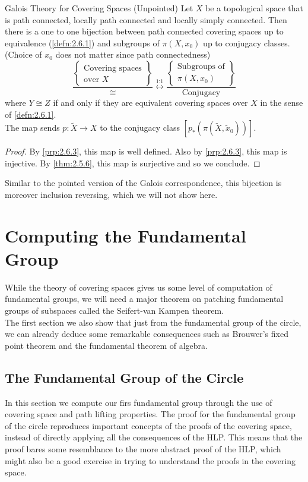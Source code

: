 \documentclass[a4paper]{article}
\begin{document}
\begin{thm}{Galois Theory for Covering Spaces (Unpointed)}{} Let $X$ be a topological space that is path connected, locally path connected and locally simply connected. Then there is a one to one bijection between path connected covering spaces up to equivalence (\ref{defn:2.6.1}) and subgroups of $\pi(X,x_0)$ up to conjugacy classes. (Choice of $x_0$ does not matter since path connectedness) $$\frac{\left\{\substack{\text{Covering spaces}\\\text{over }X}\right\}}{\cong}\overset{\text{1:1}}{\longleftrightarrow}\frac{\left\{\substack{\text{Subgroups of}\\\pi(X,x_0)}\right\}}{\text{Conjugacy}}$$ where $Y\cong Z$ if and only if they are equivalent covering spaces over $X$ in the sense of \ref{defn:2.6.1}. \\

The map sends $p:\widetilde{X}\to X$ to the conjugacy class $[p_\ast(\pi(\widetilde{X},\widetilde{x}_0))]$. 
\begin{proof}
By \ref{prp:2.6.3}, this map is well defined. Also by \ref{prp:2.6.3}, this map is injective. By \ref{thm:2.5.6}, this map is surjective and so we conclude. 
\end{proof}
\end{thm}

Similar to the pointed version of the Galois correspondence, this bijection is moreover inclusion reversing, which we will not show here. 

\pagebreak
\section{Computing the Fundamental Group}
While the theory of covering spaces gives us some level of computation of fundamental groups, we will need a major theorem on patching fundamental groups of subspaces called the Seifert-van Kampen theorem. \\

The first section we also show that just from the fundamental group of the circle, we can already deduce some remarkable consequences such as Brouwer's fixed point theorem and the fundamental theorem of algebra. 

\subsection{The Fundamental Group of the Circle}
In this section we compute our firs fundamental group through the use of covering space and path lifting properties. The proof for the fundamental group of the circle reproduces important concepts of the proofs of the covering space, instead of directly applying all the consequences of the HLP. This means that the proof bares some resemblance to the more abstract proof of the HLP, which might also be a good exercise in trying to understand the proofs in the covering space. 
\end{document}
